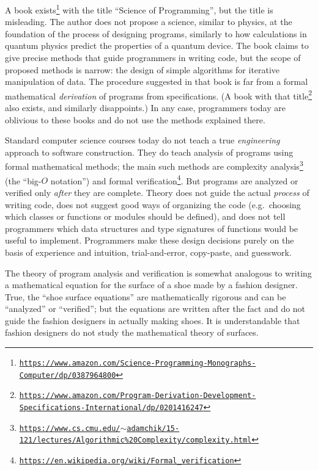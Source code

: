 A book exists\footnote{\texttt{\href{https://www.amazon.com/Science-Programming-Monographs-Computer/dp/0387964800}{https://www.amazon.com/Science-Programming-Monographs-Computer/dp/0387964800}}}
with the title ``Science of Programming'', but the title is misleading.
The author does not propose a science, similar to physics, at the
foundation of the process of designing programs, similarly to how
calculations in quantum physics predict the properties of a quantum
device. The book claims to give precise methods that guide programmers
in writing code, but the scope of proposed methods is narrow: the
design of simple algorithms for iterative manipulation of data. The
procedure suggested in that book is far from a formal mathematical
\emph{derivation} of programs from specifications. (A book with that
title\footnote{\texttt{\href{https://www.amazon.com/Program-Derivation-Development-Specifications-International/dp/0201416247}{https://www.amazon.com/Program-Derivation-Development-Specifications-International/dp/0201416247}}}
also exists, and similarly disappoints.) In any case, programmers
today are oblivious to these books and do not use the methods explained
there.

Standard computer science courses today do not teach a true \emph{engineering}
approach to software construction. They do teach analysis of programs
using formal mathematical methods; the main such methods are complexity
analysis\footnote{\texttt{\href{https://www.cs.cmu.edu/~adamchik/15-121/lectures/Algorithmic\%20Complexity/complexity.html}{https://www.cs.cmu.edu/$\sim$adamchik/15-121/lectures/Algorithmic\%20Complexity/complexity.html}}}
(the ``big-$O$ notation'') and formal verification\footnote{\texttt{\href{https://en.wikipedia.org/wiki/Formal_verification}{https://en.wikipedia.org/wiki/Formal\_verification}}}.
But programs are analyzed or verified only \emph{after} they are complete.
Theory does not guide the actual \emph{process} of writing code, does
not suggest good ways of organizing the code (e.g.~choosing which
classes or functions or modules should be defined), and does not tell
programmers which data structures and type signatures of functions
would be useful to implement. Programmers make these design decisions
purely on the basis of experience and intuition, trial-and-error,
copy-paste, and guesswork. 

The theory of program analysis and verification is somewhat analogous
to writing a mathematical equation for the surface of a shoe made
by a fashion designer. True, the ``shoe surface equations'' are
mathematically rigorous and can be ``analyzed'' or ``verified'';
but the equations are written after the fact and do not guide the
fashion designers in actually making shoes. It is understandable that
fashion designers do not study the mathematical theory of surfaces.

